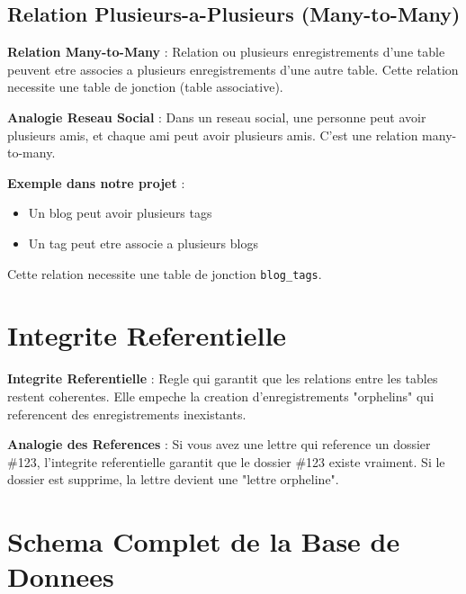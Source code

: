 \documentclass[a4paper,12pt]{book}
\begin{document}
\subsection{Relation Plusieurs-a-Plusieurs (Many-to-Many)}

\begin{definitionbox}
    \textbf{Relation Many-to-Many} : Relation ou plusieurs enregistrements d'une table peuvent etre associes a plusieurs enregistrements d'une autre table. Cette relation necessite une table de jonction (table associative).
\end{definitionbox}

\begin{analogybox}
    \textbf{Analogie Reseau Social} : Dans un reseau social, une personne peut avoir plusieurs amis, et chaque ami peut avoir plusieurs amis. C'est une relation many-to-many.
\end{analogybox}

\textbf{Exemple dans notre projet} :
\begin{itemize}
    \item Un blog peut avoir plusieurs tags
    \item Un tag peut etre associe a plusieurs blogs
\end{itemize}

Cette relation necessite une table de jonction \texttt{blog\_tags}.

\section{Integrite Referentielle}

\begin{definitionbox}
    \textbf{Integrite Referentielle} : Regle qui garantit que les relations entre les tables restent coherentes. Elle empeche la creation d'enregistrements "orphelins" qui referencent des enregistrements inexistants.
\end{definitionbox}

\begin{analogybox}
    \textbf{Analogie des References} : Si vous avez une lettre qui reference un dossier \#123, l'integrite referentielle garantit que le dossier \#123 existe vraiment. Si le dossier est supprime, la lettre devient une "lettre orpheline".
\end{analogybox}

\section{Schema Complet de la Base de Donnees}
\end{document}
